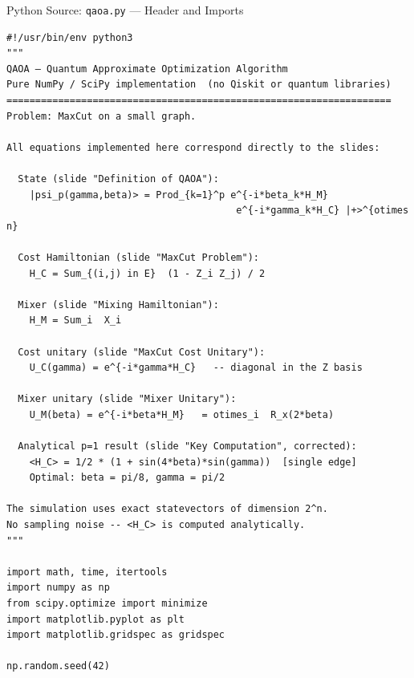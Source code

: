\documentclass{beamer}
\begin{document}
\begin{frame}{Python Source: \texttt{qaoa.py} --- Header and Imports}
\footnotesize
\begin{verbatim}
#!/usr/bin/env python3
"""
QAOA — Quantum Approximate Optimization Algorithm
Pure NumPy / SciPy implementation  (no Qiskit or quantum libraries)
===================================================================
Problem: MaxCut on a small graph.

All equations implemented here correspond directly to the slides:

  State (slide "Definition of QAOA"):
    |psi_p(gamma,beta)> = Prod_{k=1}^p e^{-i*beta_k*H_M}
                                        e^{-i*gamma_k*H_C} |+>^{otimes n}

  Cost Hamiltonian (slide "MaxCut Problem"):
    H_C = Sum_{(i,j) in E}  (1 - Z_i Z_j) / 2

  Mixer (slide "Mixing Hamiltonian"):
    H_M = Sum_i  X_i

  Cost unitary (slide "MaxCut Cost Unitary"):
    U_C(gamma) = e^{-i*gamma*H_C}   -- diagonal in the Z basis

  Mixer unitary (slide "Mixer Unitary"):
    U_M(beta) = e^{-i*beta*H_M}   = otimes_i  R_x(2*beta)

  Analytical p=1 result (slide "Key Computation", corrected):
    <H_C> = 1/2 * (1 + sin(4*beta)*sin(gamma))  [single edge]
    Optimal: beta = pi/8, gamma = pi/2

The simulation uses exact statevectors of dimension 2^n.
No sampling noise -- <H_C> is computed analytically.
"""

import math, time, itertools
import numpy as np
from scipy.optimize import minimize
import matplotlib.pyplot as plt
import matplotlib.gridspec as gridspec

np.random.seed(42)
\end{verbatim}
\end{frame}

\end{document}
